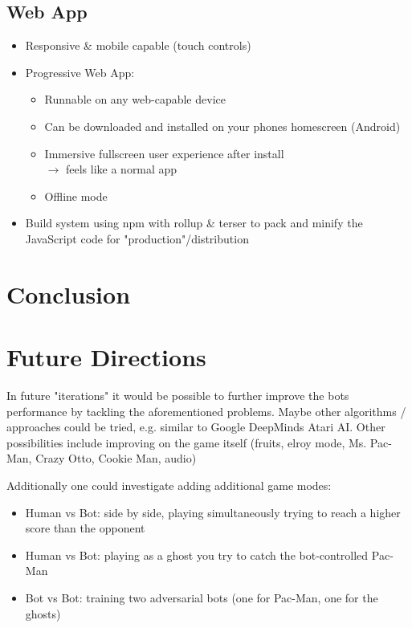 \documentclass[10pt, letterpaper]{article}
\begin{document}
        \subsection{Web App}
            \begin{itemize}
                \item Responsive \& mobile capable (touch controls)
                \item Progressive Web App:
                    \begin{itemize}
                        \item Runnable on any web-capable device
                        \item Can be downloaded and installed on your phones homescreen (Android)
                        \item Immersive fullscreen user experience after install \\
                              $\rightarrow$ feels like a normal app
                        \item Offline mode
                    \end{itemize}
                \item Build system using npm with rollup \& terser to pack and minify the JavaScript code for "production"/distribution
            \end{itemize}
            
    \section{Conclusion}
    
    \section{Future Directions}
        In future "iterations" it would be possible to further improve the bots performance by tackling the aforementioned problems. Maybe other algorithms / approaches could be tried, e.g. similar to Google DeepMinds Atari AI. Other possibilities include improving on the game itself (fruits, elroy mode, Ms. Pac-Man, Crazy Otto, Cookie Man, audio) 
        
        \vspace{1em}\noindent
        Additionally one could investigate adding additional game modes:
        \begin{itemize}
            \item Human vs Bot: side by side, playing simultaneously trying to reach a higher score than the opponent
            
            \item Human vs Bot: playing as a ghost you try to catch the bot-controlled Pac-Man
            
            \item Bot vs Bot: training two adversarial bots (one for Pac-Man, one for the ghosts)
        \end{itemize}
    
\end{document}
